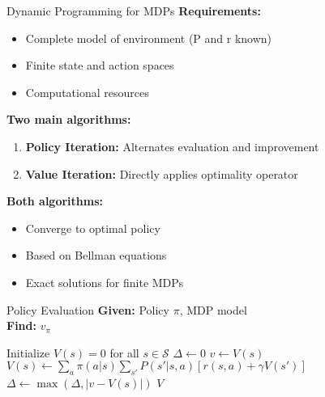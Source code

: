 \documentclass[aspectratio=169,10pt]{beamer}
\begin{document}
\begin{frame}{Dynamic Programming for MDPs}
\textbf{Requirements:}
\begin{itemize}
    \item Complete model of environment (P and r known)
    \item Finite state and action spaces
    \item Computational resources
\end{itemize}

\textbf{Two main algorithms:}
\begin{enumerate}
    \item \textbf{Policy Iteration:} Alternates evaluation and improvement
    \item \textbf{Value Iteration:} Directly applies optimality operator
\end{enumerate}

\textbf{Both algorithms:}
\begin{itemize}
    \item Converge to optimal policy
    \item Based on Bellman equations
    \item Exact solutions for finite MDPs
\end{itemize}
\end{frame}

\begin{frame}{Policy Evaluation}
\textbf{Given:} Policy $\pi$, MDP model \\
\textbf{Find:} $v_\pi$

\begin{algorithm}[H]
\caption{Iterative Policy Evaluation}
\begin{algorithmic}[1]
\STATE Initialize $V(s) = 0$ for all $s \in \mathcal{S}$
\REPEAT
    \STATE $\Delta \leftarrow 0$
        \STATE $v \leftarrow V(s)$
        \STATE $V(s) \leftarrow \sum_a \pi(a|s) \sum_{s'} P(s'|s,a)[r(s,a) + \gamma V(s')]$
        \STATE $\Delta \leftarrow \max(\Delta, |v - V(s)|)$
    \ENDFOR
\UNTIL{$\Delta < \epsilon$}
\RETURN $V$
\end{algorithmic}
\end{algorithm}
\end{frame}
\end{document}
